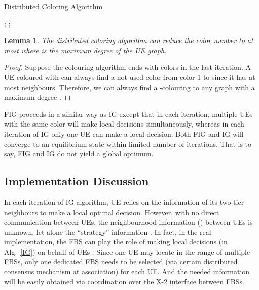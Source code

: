 \documentclass[conference]{IEEEtran}
\newtheorem{lemma}{Lemma}
\begin{document}
\begin{algorithm}[h]
\caption{Distributed Coloring Algorithm}
\label{DC}
; ;\\
\end{algorithm}	


\begin{lemma} 
The distributed coloring algorithm can reduce the color number to at most  where  is the maximum degree of the UE graph.
\end{lemma}
\begin{proof}
Suppose the colouring algorithm ends with  colors in the last iteration. A UE coloured with  can always find a not-used color from color 1 to  since it has at most  neighbours. Therefore, we can always find a -colouring to any graph with a maximum degree .
\end{proof}



FIG proceeds in a similar way as IG except that in each iteration, multiple UEs with the same color will make local decisions simultaneously, whereas in each iteration of IG only one UE can make a local decision. Both FIG and IG will converge to an equilibrium state within limited number of iterations. That is to say, FIG and IG do not yield a global optimum.





\subsection{Implementation Discussion}


In each iteration of IG algorithm, UE  relies on the information of its two-tier neighbours  to make a local optimal decision. However, with no direct communication between UEs, the neighbourhood information () between UEs is unknown, let alone the ``strategy'' information . In fact, in the real implementation, the FBS can play the role of making local decisions  (in Alg.~\ref{IG}) on behalf of UEs . Since one UE  may locate in the range of multiple FBSs, only one dedicated FBS needs to be selected (via certain distributed consensus mechanism at association) for each UE. And the needed information  will be easily obtained via coordination over the X-2 interface between FBSs.  
\end{document}
